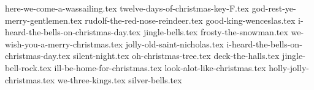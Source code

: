 \documentclass[letterpaper]{article}
\begin{document}

\begin{songs}{}

{here-we-come-a-wassailing.tex}
{twelve-days-of-christmas-key-F.tex}
{god-rest-ye-merry-gentlemen.tex}
{rudolf-the-red-nose-reindeer.tex}
{good-king-wenceslas.tex}
{i-heard-the-bells-on-christmas-day.tex}
{jingle-bells.tex}
{frosty-the-snowman.tex}
{we-wish-you-a-merry-christmas.tex}
{jolly-old-saint-nicholas.tex}
{i-heard-the-bells-on-christmas-day.tex}
{silent-night.tex}
{oh-christmas-tree.tex}
{deck-the-halls.tex}
{jingle-bell-rock.tex}
{ill-be-home-for-christmas.tex}
{look-alot-like-christmas.tex}
{holly-jolly-christmas.tex}
{we-three-kings.tex}
{silver-bells.tex}

\begin{comment}
\end{comment}

\end{songs}
\end{document}

